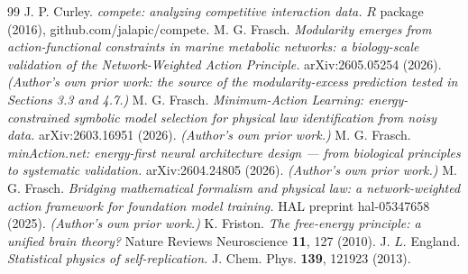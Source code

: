 \documentclass[aps,pre,preprint,superscriptaddress,nofootinbib,longbibliography]{revtex4-2}
\begin{document}
\begin{thebibliography}{99}
 J. P. Curley. \emph{compete: analyzing competitive interaction data.} $R$ package (2016), github.com/jalapic/compete.
 M. G. Frasch. \emph{Modularity emerges from action-functional constraints in marine metabolic networks: a biology-scale validation of the Network-Weighted Action Principle.} arXiv:2605.05254 (2026). \emph{(Author's own prior work: the source of the modularity-excess prediction tested in Sections 3.3 and 4.7.)}
 M. G. Frasch. \emph{Minimum-Action Learning: energy-constrained symbolic model selection for physical law identification from noisy data.} arXiv:2603.16951 (2026). \emph{(Author's own prior work.)}
 M. G. Frasch. \emph{minAction.net: energy-first neural architecture design --- from biological principles to systematic validation.} arXiv:2604.24805 (2026). \emph{(Author's own prior work.)}
 M. G. Frasch. \emph{Bridging mathematical formalism and physical law: a network-weighted action framework for foundation model training.} HAL preprint hal-05347658 (2025). \emph{(Author's own prior work.)}
 K. Friston. \emph{The free-energy principle: a unified brain theory?} Nature Reviews Neuroscience \textbf{11}, 127 (2010).
 J. $L$. England. \emph{Statistical physics of self-replication.} J. Chem. Phys. \textbf{139}, 121923 (2013).
\end{thebibliography}
\end{document}
